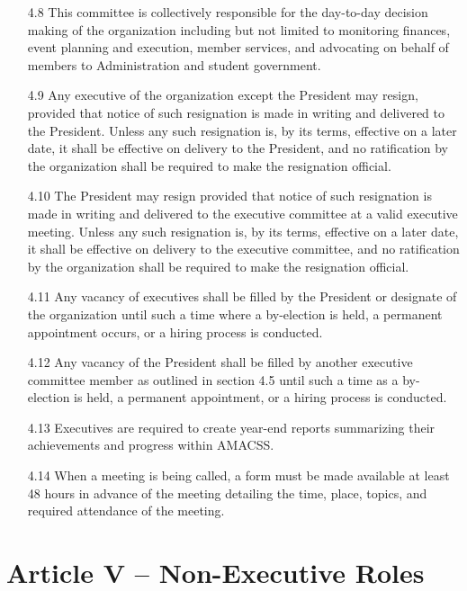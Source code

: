 \documentclass[12pt,a4paper]{article}
\begin{document}
\begin{enumerate}
\item[4.8] This committee is collectively responsible for the day-to-day decision making of the organization including but not limited to monitoring finances, event planning and execution, member services, and advocating on behalf of members to Administration and student government.

\item[4.9] Any executive of the organization except the President may resign, provided that notice of such resignation is made in writing and delivered to the President. Unless any such resignation is, by its terms, effective on a later date, it shall be effective on delivery to the President, and no ratification by the organization shall be required to make the resignation official.

\item[4.10] The President may resign provided that notice of such resignation is made in writing and delivered to the executive committee at a valid executive meeting. Unless any such resignation is, by its terms, effective on a later date, it shall be effective on delivery to the executive committee, and no ratification by the organization shall be required to make the resignation official.

\item[4.11] Any vacancy of executives shall be filled by the President or designate of the organization until such a time where a by-election is held, a permanent appointment occurs, or a hiring process is conducted.

\item[4.12] Any vacancy of the President shall be filled by another executive committee member as outlined in section 4.5 until such a time as a by-election is held, a permanent appointment, or a hiring process is conducted.

\item[4.13] Executives are required to create year-end reports summarizing their achievements and progress within AMACSS.

\item[4.14] When a meeting is being called, a form must be made available at least 48 hours in advance of the meeting detailing the time, place, topics, and required attendance of the meeting.
\end{enumerate}

\section*{Article V – Non-Executive Roles}
\end{document}
